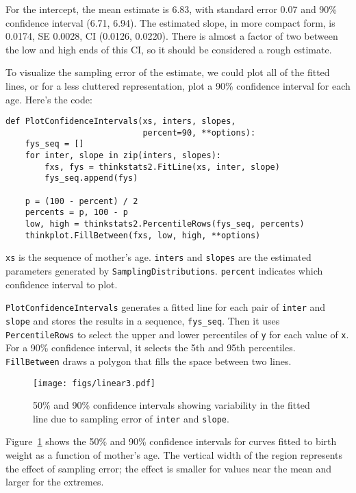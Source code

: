 For the intercept, the mean estimate is 6.83, with standard error
0.07 and 90\% confidence interval (6.71, 6.94).  The estimated slope, in
more compact form, is 0.0174, SE 0.0028, CI (0.0126, 0.0220).
There is almost a factor of two between the low and high ends of
this CI, so it should be considered a rough estimate.


To visualize the sampling error of the estimate, we could plot
all of the fitted lines, or for a less cluttered representation,
plot a 90\% confidence interval for each age.  Here's the code:

\begin{verbatim}
def PlotConfidenceIntervals(xs, inters, slopes,
                            percent=90, **options):
    fys_seq = []
    for inter, slope in zip(inters, slopes):
        fxs, fys = thinkstats2.FitLine(xs, inter, slope)
        fys_seq.append(fys)

    p = (100 - percent) / 2
    percents = p, 100 - p
    low, high = thinkstats2.PercentileRows(fys_seq, percents)
    thinkplot.FillBetween(fxs, low, high, **options)
\end{verbatim}

{\tt xs} is the sequence of mother's age.  {\tt inters} and {\tt slopes}
are the estimated parameters generated by {\tt SamplingDistributions}.
{\tt percent} indicates which confidence interval to plot.

{\tt PlotConfidenceIntervals} generates a fitted line for each pair
of {\tt inter} and {\tt slope} and stores the results in a sequence,
\verb"fys_seq".  Then it uses {\tt PercentileRows} to select the
upper and lower percentiles of {\tt y} for each value of {\tt x}.
For a 90\% confidence interval, it selects the 5th and 95th percentiles.
{\tt FillBetween} draws a polygon that fills the space between two
lines.

\begin{figure}
\centerline{\texttt{[image: figs/linear3.pdf]}}
\caption{50\% and 90\% confidence intervals showing variability in the
  fitted line due to sampling error of {\tt inter} and {\tt slope}.}
\label{linear3}
\end{figure}

Figure~\ref{linear3} shows the 50\% and 90\% confidence
intervals for curves fitted to birth weight as a function of
mother's age.
  The vertical width of the region represents the effect of
sampling error; the effect is smaller for values near the mean and
larger for the extremes.


